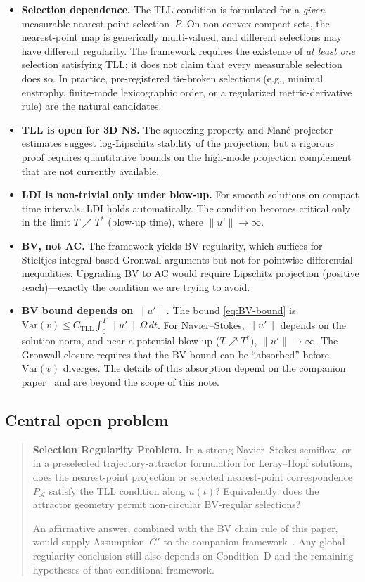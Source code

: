 \documentclass[12pt,a4paper]{article}
\theoremstyle{definition}
\theoremstyle{plain}
\theoremstyle{remark}
\newcommand{\Var}{\mathrm{Var}}
\begin{document}
\begin{itemize}
  \item \textbf{Selection dependence.}\;
    The TLL condition is formulated for a \emph{given} measurable
    nearest-point selection~$P$.  On non-convex compact sets, the
    nearest-point map is generically multi-valued, and different
    selections may have different regularity.  The framework requires
    the existence of \emph{at least one} selection satisfying TLL;
    it does not claim that every measurable selection does so.  In
    practice, pre-registered tie-broken selections (e.g., minimal
    enstrophy, finite-mode lexicographic order, or a regularized
    metric-derivative rule) are the natural candidates.
  \item \textbf{TLL is open for 3D NS.}\;
    The squeezing property and Mané projector estimates suggest
    log-Lipschitz stability of the projection, but a rigorous proof
    requires quantitative bounds on the high-mode projection
    complement that are not currently available.
  \item \textbf{LDI is non-trivial only under blow-up.}\;
    For smooth solutions on compact time intervals, LDI holds
    automatically.  The condition becomes critical only in the
    limit $T \nearrow T^*$ (blow-up time), where $\|u'\| \to \infty$.
  \item \textbf{BV, not AC.}\;
    The framework yields BV regularity, which suffices for
    Stieltjes-integral-based Gronwall arguments but not for
    pointwise differential inequalities.  Upgrading BV to AC
    would require Lipschitz projection (positive reach)---exactly
    the condition we are trying to avoid.
  \item \textbf{BV bound depends on $\|u'\|$.}\;
    The bound \eqref{eq:BV-bound} is
    $\Var(v) \le C_{\mathrm{TLL}} \int_0^T \|u'\|\,\Omega\,dt$.
    For Navier--Stokes, $\|u'\|$ depends on the solution norm,
    and near a potential blow-up ($T \nearrow T^*$),
    $\|u'\| \to \infty$.  The Gronwall closure requires that the
    BV bound can be ``absorbed'' before $\Var(v)$ diverges.  The
    details of this absorption depend on the companion
    paper~\cite{FST-NS2026} and are beyond the scope of this note.
\end{itemize}


\subsection*{Central open problem}
\begin{quote}
\textbf{Selection Regularity Problem.}
In a strong Navier--Stokes semiflow, or in a preselected
trajectory-attractor formulation for Leray--Hopf solutions, does the
nearest-point projection or selected nearest-point correspondence
$P_\mathcal{A}$ satisfy the TLL condition along $u(t)$? Equivalently:
does the attractor geometry permit non-circular BV-regular selections?

An affirmative answer, combined with the BV chain rule of this paper, would supply Assumption~$G'$ to the companion framework~\cite{FST-NS2026}.  Any global-regularity conclusion still also depends on Condition~D and the remaining hypotheses of that conditional framework.
\end{quote}
\end{document}
